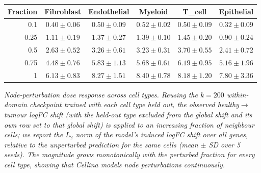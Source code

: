\begin{center}
\begin{tabular}{rccccc}
\toprule
Fraction & Fibroblast & Endothelial & Myeloid & T\_cell & Epithelial \\
\midrule
0.1 & $0.40 \pm 0.06$ & $0.50 \pm 0.09$ & $0.52 \pm 0.02$ & $0.50 \pm 0.09$ & $0.32 \pm 0.09$ \\
0.25 & $1.11 \pm 0.19$ & $1.37 \pm 0.27$ & $1.39 \pm 0.10$ & $1.45 \pm 0.20$ & $0.90 \pm 0.24$ \\
0.5 & $2.63 \pm 0.52$ & $3.26 \pm 0.61$ & $3.23 \pm 0.31$ & $3.70 \pm 0.55$ & $2.41 \pm 0.72$ \\
0.75 & $4.48 \pm 0.76$ & $5.83 \pm 1.13$ & $5.68 \pm 0.61$ & $6.19 \pm 0.95$ & $5.16 \pm 1.96$ \\
1 & $6.13 \pm 0.83$ & $8.27 \pm 1.51$ & $8.40 \pm 0.78$ & $8.18 \pm 1.20$ & $7.80 \pm 3.36$ \\
\bottomrule
\end{tabular}
\end{center}
\noindent\small\textit{Node-perturbation dose response across cell types. Reusing the $k=200$ within-domain checkpoint trained with each cell type held out, the observed healthy$\rightarrow$tumour logFC shift (with the held-out type excluded from the global shift and its own row set to that global shift) is applied to an increasing fraction of neighbour cells; we report the $L_2$ norm of the model's induced logFC shift over all genes, relative to the unperturbed prediction for the same cells (mean $\pm$ SD over 5 seeds). The magnitude grows monotonically with the perturbed fraction for every cell type, showing that Cellina models node perturbations continuously.}\normalsize
